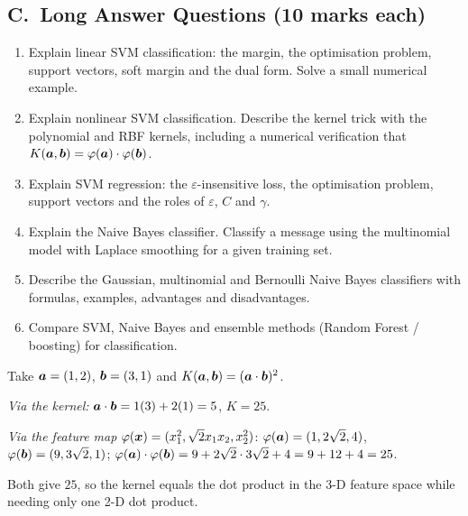 \subsection*{C.\ Long Answer Questions (10 marks each)}
\begin{enumerate}
  \item Explain linear SVM classification: the margin, the optimisation problem, support vectors, soft margin and the dual form. Solve a small numerical example. 
  \item Explain nonlinear SVM classification. Describe the kernel trick with the polynomial and RBF kernels, including a numerical verification that $K(\boldsymbol{a},\boldsymbol{b})=\varphi(\boldsymbol{a})\cdot\varphi(\boldsymbol{b})$. 
  \item Explain SVM regression: the $\varepsilon$-insensitive loss, the optimisation problem, support vectors and the roles of $\varepsilon$, $C$ and $\gamma$. 
  \item Explain the Naive Bayes classifier. Classify a message using the multinomial model with Laplace smoothing for a given training set. 
  \item Describe the Gaussian, multinomial and Bernoulli Naive Bayes classifiers with formulas, examples, advantages and disadvantages. 
  \item Compare SVM, Naive Bayes and ensemble methods (Random Forest / boosting) for classification. 
\end{enumerate}

\begin{modelans}
Take $\boldsymbol{a}=(1,2)$, $\boldsymbol{b}=(3,1)$ and $K(\boldsymbol{a},\boldsymbol{b})=(\boldsymbol{a}\cdot\boldsymbol{b})^2$.\par
\emph{Via the kernel:} $\boldsymbol{a}\cdot\boldsymbol{b}=1(3)+2(1)=5$, $K=25$.\par
\emph{Via the feature map} $\varphi(\boldsymbol{x})=(x_1^2,\sqrt2x_1x_2,x_2^2)$: $\varphi(\boldsymbol{a})=(1,2\sqrt2,4)$, $\varphi(\boldsymbol{b})=(9,3\sqrt2,1)$; $\varphi(\boldsymbol{a})\cdot\varphi(\boldsymbol{b})=9+2\sqrt2\cdot3\sqrt2+4=9+12+4=25$.\par
Both give $25$, so the kernel equals the dot product in the 3-D feature space while needing only one 2-D dot product.
\end{modelans}

